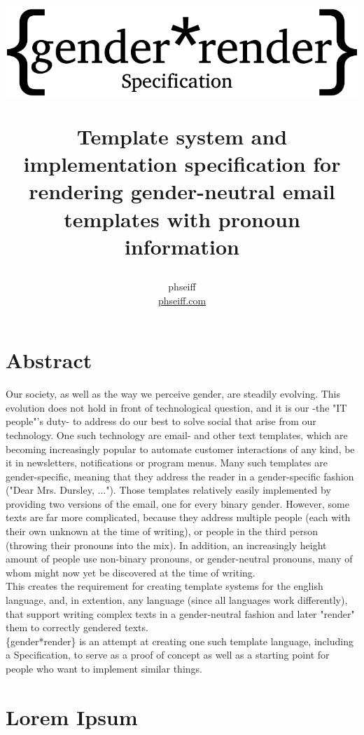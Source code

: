 \documentclass{article}
\author{phseiff\\ \href{https://phseiff.com}{phseiff.com}}
\title{\begin{center}
           \includegraphics{images/title-black.pdf}
\end{center} Template system and implementation specification for rendering gender-neutral email templates with pronoun information}
\begin{document}
\maketitle
\tableofcontents

\section{Abstract}

    Our society, as well as the way we perceive gender, are steadily evolving.
    This evolution does not hold in front of technological question, and it is our -the "IT people"'s duty- to address do our best to solve social that arise from our technology.
    One such technology are email- and other text templates, which are becoming increasingly popular to automate customer interactions of any kind, be it in newsletters, notifications or program menus.
    Many such templates are gender-specific, meaning that they address the reader in a gender-specific fashion ("Dear Mrs. Dursley, ...").
    Those templates relatively easily implemented by providing two versions of the email, one for every binary gender.
    However, some texts are far more complicated, because they address multiple people (each with their own unknown at the time of writing), or people in the third person (throwing their pronouns into the mix).
    In addition, an increasingly height amount of people use non-binary pronouns, or gender-neutral pronouns, many of whom might now yet be discovered at the time of writing.\\
    This creates the requirement for creating template systems for the english language, and, in extention, any language (since all languages work differently), that support writing complex texts in a gender-neutral fashion and later "render" them to correctly gendered texts.\\
    \{gender*render\} is an attempt at creating one such template language, including a Specification, to serve as a proof of concept as well as a starting point for people who want to implement similar things.



\section{Lorem Ipsum}
\end{document}
